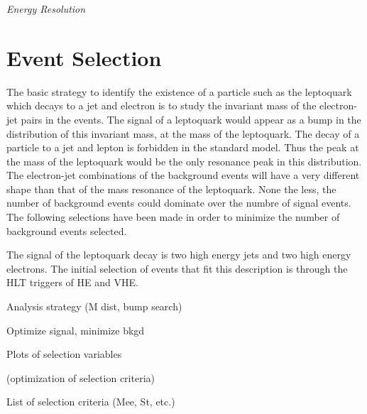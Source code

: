 \documentclass{cmspaper}
\begin{document}



{\Large \sl Energy Resolution}



\section{Event Selection}

The basic strategy to identify the existence of a particle such as the leptoquark which decays to a jet and electron is to study the invariant mass of the electron-jet pairs in the events.  The signal of a leptoquark would appear as a bump in the distribution of this invariant mass, at the mass of the leptoquark.  The decay of a particle to a jet and lepton is forbidden in the standard model.  Thus the peak at the mass of the leptoquark would be the only resonance peak in this distribution.  The electron-jet combinations of the background events will have a very different shape than that of the mass resonance of the leptoquark.  None the less, the number of background events could dominate over the numbre of signal events.  The following selections have been made in order to minimize the number of background events selected.

The signal of the leptoquark decay is two high energy jets and two high energy electrons.  The initial selection of events that fit this description is through the HLT triggers of HE and VHE.  

Analysis strategy (M dist, bump search)

Optimize signal, minimize bkgd



Plots of selection variables

(optimization of selection criteria)

List of selection criteria (Mee, St, etc.)
\end{document}
